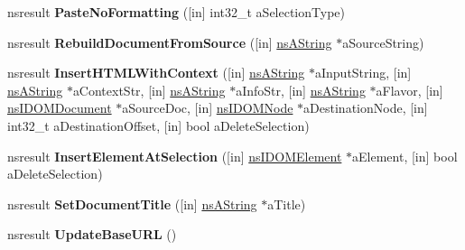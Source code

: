 \begin{DoxyCompactItemize}
\item 
\mbox{\label{interfacens_i_h_t_m_l_editor_a77ad29a0e0e2607671d36eb5544d8e3b}} 
nsresult {\bfseries Paste\+No\+Formatting} (\mbox{[}in\mbox{]} int32\+\_\+t a\+Selection\+Type)
\item 
\mbox{\label{interfacens_i_h_t_m_l_editor_a0be4bbd1ecff54330ba321fee14bf06b}} 
nsresult {\bfseries Rebuild\+Document\+From\+Source} (\mbox{[}in\mbox{]} \hyperlink{structns_string_container}{ns\+A\+String} $\ast$a\+Source\+String)
\item 
\mbox{\label{interfacens_i_h_t_m_l_editor_ae5f0847daacf2d5d8683c5a6cee0b54c}} 
nsresult {\bfseries Insert\+H\+T\+M\+L\+With\+Context} (\mbox{[}in\mbox{]} \hyperlink{structns_string_container}{ns\+A\+String} $\ast$a\+Input\+String, \mbox{[}in\mbox{]} \hyperlink{structns_string_container}{ns\+A\+String} $\ast$a\+Context\+Str, \mbox{[}in\mbox{]} \hyperlink{structns_string_container}{ns\+A\+String} $\ast$a\+Info\+Str, \mbox{[}in\mbox{]} \hyperlink{structns_string_container}{ns\+A\+String} $\ast$a\+Flavor, \mbox{[}in\mbox{]} \hyperlink{interfacens_i_d_o_m_document}{ns\+I\+D\+O\+M\+Document} $\ast$a\+Source\+Doc, \mbox{[}in\mbox{]} \hyperlink{interfacens_i_d_o_m_node}{ns\+I\+D\+O\+M\+Node} $\ast$a\+Destination\+Node, \mbox{[}in\mbox{]} int32\+\_\+t a\+Destination\+Offset, \mbox{[}in\mbox{]} bool a\+Delete\+Selection)
\item 
\mbox{\label{interfacens_i_h_t_m_l_editor_aacf2470c0b0d8c1d3188191049f2f878}} 
nsresult {\bfseries Insert\+Element\+At\+Selection} (\mbox{[}in\mbox{]} \hyperlink{interfacens_i_d_o_m_element}{ns\+I\+D\+O\+M\+Element} $\ast$a\+Element, \mbox{[}in\mbox{]} bool a\+Delete\+Selection)
\item 
\mbox{\label{interfacens_i_h_t_m_l_editor_a5c314b58dee39325cac080bf2ec157a1}} 
nsresult {\bfseries Set\+Document\+Title} (\mbox{[}in\mbox{]} \hyperlink{structns_string_container}{ns\+A\+String} $\ast$a\+Title)
\item 
\mbox{\label{interfacens_i_h_t_m_l_editor_aa11ba0c3a1e75067d33a092edce04aed}} 
nsresult {\bfseries Update\+Base\+U\+RL} ()
\item 

\end{DoxyCompactItemize}
